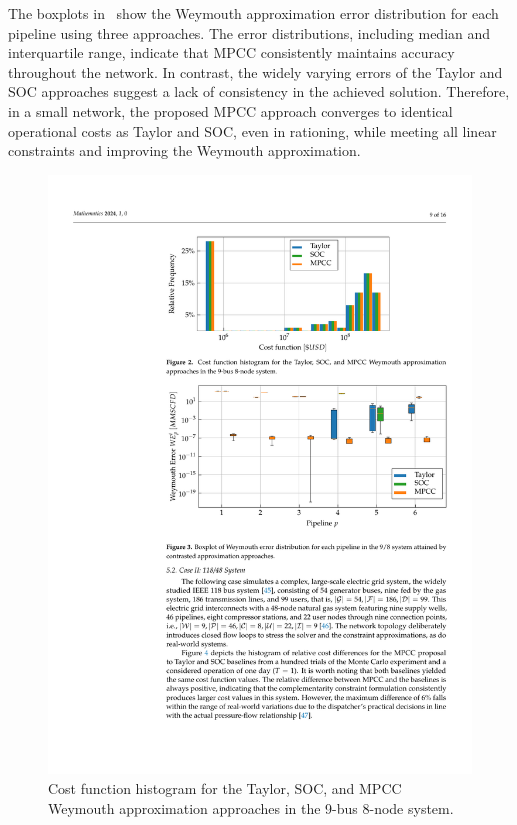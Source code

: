 The boxplots in~ show the Weymouth approximation error distribution for each pipeline using three approaches. The error distributions, including median and interquartile range, indicate that MPCC consistently maintains accuracy throughout the network. In contrast, the widely varying errors of the Taylor and SOC approaches suggest a lack of consistency in the achieved solution. Therefore, in a small network, the proposed MPCC approach converges to identical operational costs as Taylor and SOC, even in rationing, while meeting all linear constraints and improving the Weymouth approximation.


\begin{figure}[H]
    \centering
    \includegraphics[scale=1]{figures/Chapter_MPCC/g001.pdf}
    \caption{Cost function histogram for the Taylor, SOC, and MPCC Weymouth approximation approaches in the 9-bus 8-node system.}
    \label{fig:blue_test_cost}
\end{figure}


